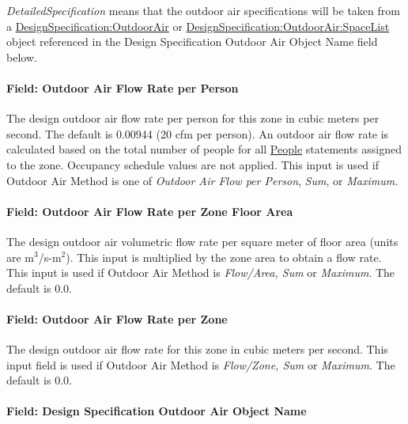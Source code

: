 \emph{DetailedSpecification} means that the outdoor air specifications will be taken from a \hyperref[designspecificationoutdoorair]{DesignSpecification:OutdoorAir} or \hyperref[designspecificationoutdoorairspacelist]{DesignSpecification:OutdoorAir:SpaceList} object referenced in the Design Specification Outdoor Air Object Name field below.

\paragraph{Field: Outdoor Air Flow Rate per Person}\label{field-outdoor-air-flow-rate-per-person}

The design outdoor air flow rate per person for this zone in cubic meters per second. The default is 0.00944 (20 cfm per person). An outdoor air flow rate is calculated based on the total number of people for all \hyperref[people]{People} statements assigned to the zone. Occupancy schedule values are not applied. This input is used if Outdoor Air Method is one of \emph{Outdoor Air Flow per Person}, \emph{Sum}, or \emph{Maximum.}

\paragraph{Field: Outdoor Air Flow Rate per Zone Floor Area}\label{field-outdoor-air-flow-rate-per-zone-floor-area}

The design outdoor air volumetric flow rate per square meter of floor area (units are m\(^{3}\)/s-m\(^{2}\)). This input is multiplied by the zone area to obtain a flow rate. This input is used if Outdoor Air Method is \emph{Flow/Area, Sum} or \emph{Maximum}. The default is 0.0.

\paragraph{Field: Outdoor Air Flow Rate per Zone}\label{field-outdoor-air-flow-rate-per-zone}

The design outdoor air flow rate for this zone in cubic meters per second. This input field is used if Outdoor Air Method is \emph{Flow/Zone, Sum} or \emph{Maximum}. The default is 0.0.

\paragraph{Field: Design Specification Outdoor Air Object Name}\label{field-design-specification-outdoor-air-object-name-001}

